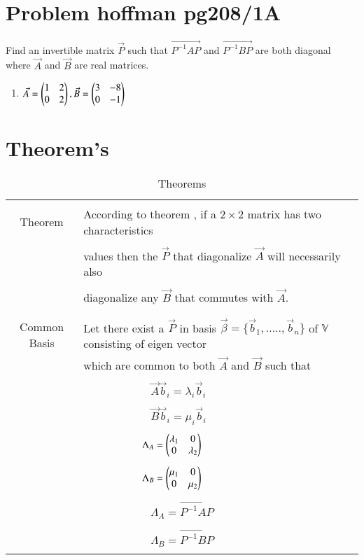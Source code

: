 \documentclass[journal,12pt]{IEEEtran}
\begin{document}
\section{\textbf{Problem hoffman pg208/1A}}
%
Find an invertible matrix $\vec{P}$ such that $\vec{P^{-1}AP}$ and $\vec{P^{-1}BP}$ are both diagonal where $\vec{A}$ and $\vec{B}$ are real matrices.
\begin{enumerate}
    \item $\Vec{A}=\begin{pmatrix}1&2\\0&2\end{pmatrix} , \Vec{B}=\begin{pmatrix}3&-8\\0&-1\end{pmatrix}$ 
    \end{enumerate}
\section{\textbf{Theorem's}}
\renewcommand{\thetable}{1}
\begin{table}[ht!]
\centering
\begin{tabular}{|c|l|}
   
	\hline
	\multirow{3}{*}{Theorem}
    &\\
    & According  to theorem , if a $2\times 2$ matrix has two characteristics \\
    &\\
    & values then the $\vec{P}$ that diagonalize $\vec{A}$ will
    necessarily also   \\
    &\\
    & diagonalize any $\vec{B}$ that commutes with $\vec{A}$. \\
    &\\
    \hline 
    &\\
    Common Basis
    &Let there exist a $\vec{P}$ in basis $\vec{\beta}=\{\vec{b}_1,.....,\vec{b}_n\}$ of $\mathbb{V}$ consisting of eigen vector\\& which are common to both $\vec{A}$ and $\vec{B}$ such that\\
    &\\
    &$\qquad\qquad\qquad\vec{A}\vec{b}_i=\lambda_{i}\vec{b}_i$\\
    &\\
    &$\qquad\qquad\qquad\vec{B}\vec{b}_i=\mu_{i}\vec{b}_i$\\
    &\\
    &$\qquad\qquad\qquad\Lambda_{A}=\begin{pmatrix}\lambda_1&0\\0&\lambda_2\end{pmatrix}$\\
    &\\
    &$\qquad\qquad\qquad\Lambda_{B}=\begin{pmatrix}\mu_1&0\\0&\mu_2\end{pmatrix}$\\
    &\\
    &$\qquad\qquad\qquad\Lambda_{A}=\vec{P^{-1}AP}$\\
    &\\
    &$\qquad\qquad\qquad\Lambda_{B}=\vec{P^{-1}BP}$\\
    &\\
    \hline

    
\end{tabular}
\label{table:1}
    \caption{Theorems }
\end{table}
\newpage
\end{document}
